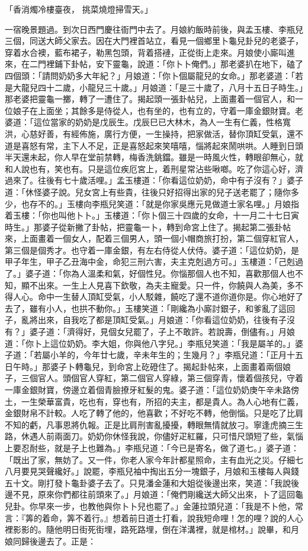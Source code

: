 \begin{showcontents}{}
「香消燭冷樓臺夜，  挑菜燒燈掃雪天。」

一宿晚景題過。到次日西門慶往衙門中去了。月娘約飯時前後，與孟玉樓、李瓶兒三個，同送大師父家去。因在大門裡首站立，看見一個鄉里卜龜兒卦兒的老婆子，穿着水合襖，藍布裙子，勒黑包頭，背着搭褳，正從街上走來。月娘使小廝叫進來，在二門裡鋪下卦帖，安下靈龜，說道：「你卜卜俺們。」那老婆扒在地下，磕了四個頭：「請問奶奶多大年紀？」月娘道：「你卜個屬龍兒的女命。」那老婆道：「若是大龍兒四十二歲，小龍兒三十歲。」月娘道：「是三十歲了，八月十五日子時生。」那老婆把靈龜一擲，轉了一遭住了。揭起頭一張卦帖兒，上面畫着一個官人，和一位娘子在上面坐；其餘多是侍從人，也有坐的，也有立的，守着一庫金銀財寶。老婆道：「這位當家的奶奶是戊辰生。戊辰巳已大林木，為人一生有仁義，性格寬洪，心慈好善，有經佈施，廣行方便，一生操持，把家做活，替你頂缸受氣，還不道是喜怒有常，主下人不足，正是喜怒起來笑嘻嘻，惱將起來鬧哄哄。人睡到日頭半天還未起，你人早在堂前禁轉，梅香洗銚鐺。雖是一時風火性，轉眼卻無心，就和人說也有，笑也有。只是這位疾厄宮上，着刑星常沾些啾啷。吃了你這心好，濟過來了。往後有七十歲活哩。」孟玉樓道：「你看這位奶奶，命中有子沒有？」婆子道：「休怪婆子說。兒女宮上有些貴，往後只好招得出家的兒子送老罷了；隨你多少，也存不的。」玉樓向李瓶兒笑道：「就是你家吳應元見做道士家名哩。」月娘指着玉樓：「你也叫他卜卜。」玉樓道：「你卜個三十四歲的女命，十一月二十七日寅時生。」那婆子從新撇了卦帖，把靈龜一卜，轉到命宮上住了。揭起第二張卦帖來，上面畫着一個女人，配着三個男人，頭一個小帽商旅打扮，第二個穿紅官人，第三個是個秀才。也守着一庫金銀，有左右侍從人伏侍。婆子道：「這位奶奶，是甲子年生，甲子乙丑海中金，命犯三刑六害，夫主克剋過方可。」玉樓道：「己剋過了。」婆子道：「你為人溫柔和氣，好個性兒。你惱那個人也不知，喜歡那個人也不知，顯不出來。一生上人見喜下欽敬，為夫主寵愛。只一件，你饒與人為美，多不得人心。命中一生替人頂缸受氣，小人駁雜，饒吃了還不道你道你是。你心地好了去了，雖有小人，也拱不動你。」玉樓笑道：「剛纔為小廝討銀子，和爹亂了這回子，亂將出來，自我吃了都是頂缸受氣。」月娘道：「你看這位奶奶，往後有子沒有？」婆子道：「濟得好，見個女兒罷了，子上不敢許。若說壽，倒儘有。」月娘道：「你卜上這位奶奶。李大姐，你與他八字兒。」李瓶兒笑道：「我是屬羊的。」婆子道：「若屬小羊的，今年廿七歲，辛未年生的；生幾月？」李瓶兒道：「正月十五日午時。」那婆子卜轉龜兒，到命宮上矻磴住了。揭起卦帖來，上面畫着兩個娘子，三個官人。頭個官人穿紅，第二個官人穿綠，第三個穿青，懷着個孩兒，守着一庫金銀財寶，傍邊立着個青臉撩牙紅髮的鬼。婆子道：「這位奶奶庚午辛未路傍土，一生榮華富貴，吃也有，穿也有，所招的夫主，都是貴人。為人心地有仁義，金銀財帛不計較。人吃了轉了他的，他喜歡；不好吃不轉，他倒惱。只是吃了比肩不知的虧，凡事恩將仇報。正是比肩刑害亂擾擾，轉眼無情就放刁。寧逢虎摘三生路，休遇人前兩面刀。奶奶你休怪我說，你儘好疋紅羅，只可惜尺頭短了些，氣惱上要忍耐些，就是子上也難為。」李瓶兒道：「今已是寄名，做了道七。」婆子道：「既出了家，無妨了。又一件，你老人家今年計都星照命，主有血光之災。仔細七八月要見哭聲纔好。」說罷，李瓶兒袖中掏出五分一塊銀子，月娘和玉樓每人與錢五十文。剛打發卜龜卦婆子去了。只見潘金蓮和大姐從後邊出來，笑道：「我說後邊不見，原來你們都往前頭來了。」月娘道：「俺們剛纔送大師父出來，卜了這回龜兒卦。你早來一步，也教他與你卜卜兒也罷了。」金蓮拉頭兒道：「我是不卜他，常言：『筭的着命，筭不着行。』想着前日道士打看，說我短命哩！怎的哩？說的人心裡影影的。隨他明日街死街埋，路死路埋，倒在洋溝裡，就是棺材。」說畢，和月娘同歸後邊去了。正是：


\end{showcontents}
